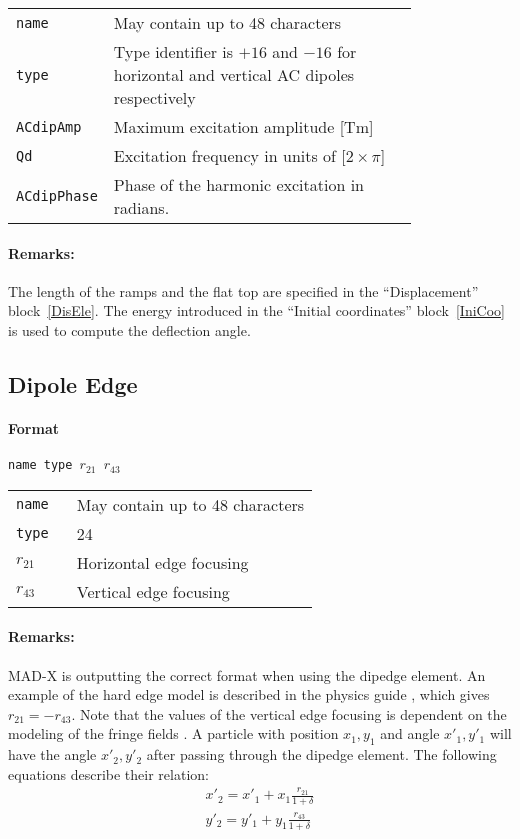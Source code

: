 \bigskip
\begin{tabular}{@{}lp{0.8\linewidth}}
    \texttt{name} & May contain up to 48 characters \\
    \texttt{type} & Type identifier is $+16$ and $-16$ for horizontal and vertical AC dipoles respectively \\
    \texttt{ACdipAmp} & Maximum excitation amplitude [Tm] \\
    \texttt{Qd}   & Excitation frequency in units of [$2 \times \pi$] \\
    \texttt{ACdipPhase} & Phase of the harmonic excitation in radians.
\end{tabular}

\paragraph{Remarks:}
The length of the ramps and the flat top are specified in the ``Displacement'' block~\ref{DisEle}. The energy introduced in the ``Initial coordinates'' block~\ref{IniCoo} is used to compute the deflection angle.

\subsection{Dipole Edge}

\paragraph{Format} \texttt{name type $r_{21}$ $r_{43}$}

\bigskip
\begin{tabular}{@{}lp{0.8\linewidth}}
    \texttt{name} & May contain up to 48 characters \\
    \texttt{type} & 24 \\
    \texttt{$r_{21}$} & Horizontal edge focusing \\
    \texttt{$r_{43}$} & Vertical edge focusing
\end{tabular}
    
\paragraph{Remarks:}
MAD-X is outputting the correct format when using the dipedge element. An example of  the hard edge model is described in the physics guide \cite{sixphys}, which gives $r_{21} = -r_{43}$.
Note that the values of the vertical edge focusing is dependent on the modeling of the fringe fields \cite{dipedge}.
A particle with position $x_{1},y_1$ and angle $x'_{1},y'_1$ will have the angle $x'_{2},y'_2$ after passing through the dipedge element.
The following equations describe their relation:
\begin{eqnarray}
    x'_{2} = x'_{1} + x_{1}\frac{r_{21}}{1+\delta} \\
    y'_{2} = y'_{1} + y_{1}\frac{r_{43}}{1+\delta}
\end{eqnarray}


